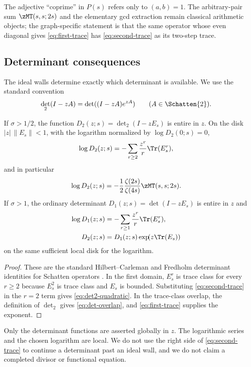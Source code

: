 The adjective ``coprime'' in $P(s)$ refers only to $(a,b)=1$.  The
arbitrary-pair sum $\zMT(s,s;2s)$ and the elementary gcd extraction remain
classical arithmetic objects; the graph-specific statement is that the
same operator whose even diagonal gives \eqref{eq:first-trace} has
\eqref{eq:second-trace} as its two-step trace.

\subsection{Determinant consequences}

The ideal walls determine exactly which determinant is available.  We use
the standard convention
\[
 \det_2(I-zA)=\det((I-zA)e^{zA})
 \qquad(A\in\Schatten{2}).
\]

\begin{corollary}
\label{cor:determinants}
If $\sigma>1/2$, the function
$D_2(z;s)=\det_2(I-zE_s)$ is entire in $z$.  On the disk
$|z|\,\|E_s\|<1$, with the logarithm normalized by
$\log D_2(0;s)=0$,
\begin{equation}
 \log D_2(z;s)
 =-\sum_{r\geq2}\frac{z^r}{r}\Tr(E_s^r),
 \label{eq:det2-local-log}
\end{equation}
and in particular
\begin{equation}
 [z^2]\log D_2(z;s)
 =-\frac12\frac{\zeta(2s)}{\zeta(4s)}
   \zMT(s,s;2s).
 \label{eq:det2-quadratic}
\end{equation}
If $\sigma>1$, the ordinary determinant
$D_1(z;s)=\det(I-zE_s)$ is entire in $z$ and
\begin{align}
 \log D_1(z;s)&=-\sum_{r\geq1}\frac{z^r}{r}\Tr(E_s^r),
 \label{eq:det1-local-log}\\
 D_2(z;s)&=D_1(z;s)\exp\!(z\Tr(E_s))
 \label{eq:det-overlap}
\end{align}
on the same sufficient local disk for the logarithm.
\end{corollary}

\begin{proof}
These are the standard Hilbert--Carleman and Fredholm determinant
identities for Schatten operators \citep{Simon2005}.  In the first domain,
$E_s^r$ is trace class for every $r\geq2$ because $E_s^2$ is trace class
and $E_s$ is bounded.  Substituting \eqref{eq:second-trace} in the
$r=2$ term gives \eqref{eq:det2-quadratic}.  In the trace-class overlap,
the definition of $\det_2$ gives \eqref{eq:det-overlap}, and
\eqref{eq:first-trace} supplies the exponent.
\end{proof}

Only the determinant functions are asserted globally in $z$.  The
logarithmic series and the chosen logarithm are local.  We do not use the
right side of \eqref{eq:second-trace} to continue a determinant past an
ideal wall, and we do not claim a completed divisor or functional equation.
